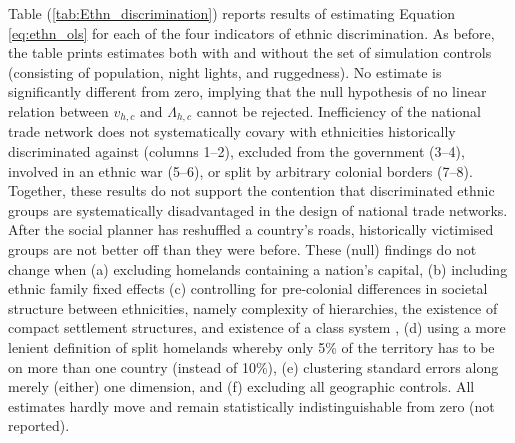 \documentclass[11pt, oneside]{article}   	%
\let\oldref\ref
\renewcommand{\ref}[1]{(\oldref{#1})}
\begin{document}
Table \ref{tab:Ethn_discrimination} reports results of estimating Equation \eqref{eq:ethn_ols} for each of the four indicators of ethnic discrimination. As before, the table prints estimates both with and without the set of simulation controls (consisting of population, night lights, and ruggedness). No estimate is significantly different from zero, implying that the null hypothesis of no linear relation between $v_{h,c}$ and $\Lambda_{h,c}$ cannot be rejected. Inefficiency of the national trade network does not systematically covary with ethnicities historically discriminated against (columns 1--2), excluded from the government (3--4), involved in an ethnic war (5--6), or split by arbitrary colonial borders (7--8). Together, these results do not support the contention that discriminated ethnic groups are systematically disadvantaged in the design of national trade networks. After the social planner has reshuffled a country's roads, historically victimised groups are not better off than they were before. These (null) findings do not change when (a) excluding homelands containing a nation's capital, (b) including ethnic family fixed effects (c) controlling for pre-colonial differences in societal structure between ethnicities, namely complexity of hierarchies, the existence of compact settlement structures, and existence of a class system \citep{michalopoulos_pre-colonial_2013}, (d) using a more lenient definition of split homelands whereby only 5\% of the territory has to be on more than one country (instead of 10\%), (e) clustering standard errors along merely (either) one dimension, and (f) excluding all geographic controls. All estimates hardly move and remain statistically indistinguishable from zero (not reported).
\end{document}
